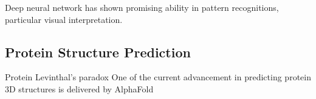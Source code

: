 Deep neural network has shown promising ability in pattern recognitions, particular visual interpretation.
\par 

\subsection{Protein Structure Prediction}
Protein Levinthal's paradox One of the current advancement in predicting protein 3D structures is delivered by AlphaFold